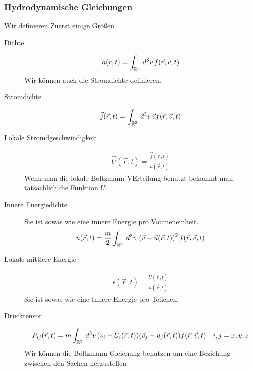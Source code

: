 \subsubsection*{Hydrodynamische Gleichungen}
Wir definieren Zuerst einige Größen
\begin{description}
  \item[Dichte] 
    \begin{align*}
      n(\vec{r}, t) = \int_{\mathbb{R}^3}^{} \,d^3 v\, f (\vec{r}, \vec{v}, t)
    \end{align*}
    Wir können auch die Stromdichte definieren.
  \item[Stromdichte]
    \begin{align*}
      \vec{j}(\vec{r}, t) = \int_{\mathbb{R}^3}^{} \,d^3 v\, \vec{v} f(\vec{r}, \vec{v}, t)
    \end{align*}
  \item[Lokale Stromdgeschwindigkeit]
    \begin{align*}
      \vec{U}(\vec{r}, t) = \frac{\vec{j}(\vec{r}, t)}{n (\vec{r}, t)}
    \end{align*}
    Wenn man die lokale Boltzmann VErteilung benutzt bekommt man tatsächlich
    die Funktion $U$.
  \item[Innere Energiedichte]
    Sie ist sowas wie eine innere Energie pro Voumeneinheit.
    \begin{align*}
      u(\vec{r}, t) = \frac{m}{2} \int_{\mathbb{R}^3}^{} \,d^3 v\,
      \left( \vec{v} - \vec{u}(\vec{r}, t) \right)^2 f(\vec{r}, \vec{v}, t)
    \end{align*}
  \item[Lokale mittlere Energie]
    \begin{align*}
      \epsilon(\vec{r}, t) = \frac{U(\vec{r}, t)}{n(\vec{r},t)}
    \end{align*}
    Sie ist sowas wie eine Innere Energie pro Teilchen. 
  \item[Drucktensor]
    \begin{align*}
      P_{ij}(\vec{r}, t) = m \int_{\mathbb{R}^3}^{} \,d^3 v\, (v_i - U_i (\vec{r}, t))
      (\vec{v}_j - u_j(\vec{r}, t)) f(\vec{r}, \vec{v}, t) && i, j = x, y , z
    \end{align*}
    Wir können die Boltzmann Gleichung benutzen um eine Beziehung zwischen den
    Sachen herzustellen
  
\end{description}
